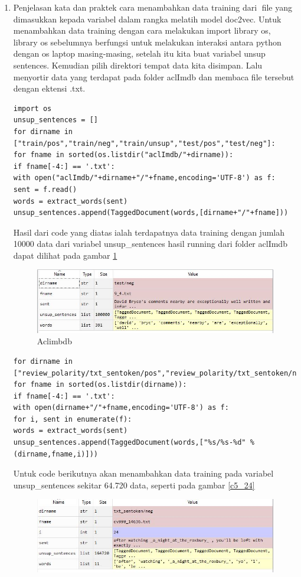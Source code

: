 \begin{enumerate}
\item Penjelasan kata dan praktek cara menambahkan data training dari file yang dimasukkan kepada variabel dalam rangka melatih model doc2vec.
\subitem Untuk menambahkan data training dengan cara melakukan import library os, library os sebelumnya berfungsi untuk melakukan interaksi antara python dengan os laptop masing-masing, setelah itu kita buat variabel unsup sentences. Kemudian pilih direktori tempat data kita disimpan. Lalu menyortir data yang terdapat pada folder aclImdb dan membaca file tersebut dengan ektensi .txt.
\begin{verbatim}
import os
unsup_sentences = []
for dirname in ["train/pos","train/neg","train/unsup","test/pos","test/neg"]:
for fname in sorted(os.listdir("aclImdb/"+dirname)):
if fname[-4:] == '.txt':
with open("aclImdb/"+dirname+"/"+fname,encoding='UTF-8') as f:
sent = f.read()
words = extract_words(sent)
unsup_sentences.append(TaggedDocument(words,[dirname+"/"+fname]))
\end{verbatim}
\subitem Hasil dari code yang diatas ialah terdapatnya data training dengan jumlah 10000 data dari variabel unsup\_sentences hasil running dari folder aclImdb dapat dilihat pada gambar \ref{c5_23}
\begin{figure}[!htbp]
\centerline{\includegraphics[width=1\textwidth]{figures/c5p/23.JPG}}
\caption{Aclimbdb}
\label{c5_23}
\end{figure}
\begin{verbatim}
for dirname in ["review_polarity/txt_sentoken/pos","review_polarity/txt_sentoken/neg"]:
for fname in sorted(os.listdir(dirname)):
if fname[-4:] == '.txt':
with open(dirname+"/"+fname,encoding='UTF-8') as f:
for i, sent in enumerate(f):
words = extract_words(sent)
unsup_sentences.append(TaggedDocument(words,["%s/%s-%d" % (dirname,fname,i)]))
\end{verbatim}
\subitem Untuk code berikutnya akan menambahkan data training pada variabel unsup\_sentences sekitar 64.720 data, seperti pada gambar \ref{c5_24}
\begin{figure}[!htbp]
\centerline{\includegraphics[width=1\textwidth]{figures/c5p/24.JPG}}

\end{figure}
\end{enumerate}
